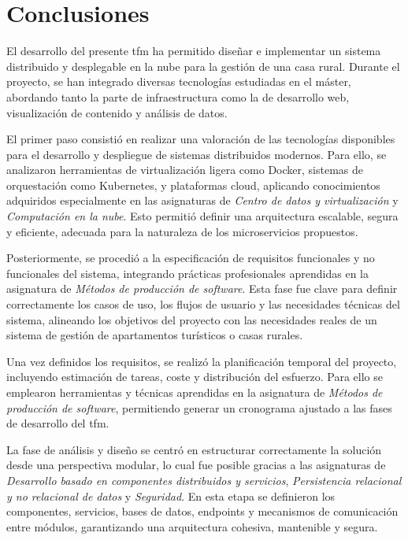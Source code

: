 \section{Conclusiones}
El desarrollo del presente \gls{tfm} ha permitido diseñar e implementar un sistema distribuido y desplegable en la nube para la gestión de una casa rural. Durante el proyecto, se han integrado diversas tecnologías estudiadas en el máster, abordando tanto la parte de infraestructura como la de desarrollo web, visualización de contenido y análisis de datos.

El primer paso consistió en realizar una valoración de las tecnologías disponibles para el desarrollo y despliegue de sistemas distribuidos modernos. Para ello, se analizaron herramientas de virtualización ligera como Docker, sistemas de orquestación como Kubernetes, y plataformas cloud, aplicando conocimientos adquiridos especialmente en las asignaturas de \textit{Centro de datos y virtualización} y \textit{Computación en la nube}. Esto permitió definir una arquitectura escalable, segura y eficiente, adecuada para la naturaleza de los microservicios propuestos.

Posteriormente, se procedió a la especificación de requisitos funcionales y no funcionales del sistema, integrando prácticas profesionales aprendidas en la asignatura de \textit{Métodos de producción de software}. Esta fase fue clave para definir correctamente los casos de uso, los flujos de usuario y las necesidades técnicas del sistema, alineando los objetivos del proyecto con las necesidades reales de un sistema de gestión de apartamentos turísticos o casas rurales.

Una vez definidos los requisitos, se realizó la planificación temporal del proyecto, incluyendo estimación de tareas, coste y distribución del esfuerzo. Para ello se emplearon herramientas y técnicas aprendidas en la asignatura de \textit{Métodos de producción de software}, permitiendo generar un cronograma ajustado a las fases de desarrollo del \gls{tfm}.

La fase de análisis y diseño se centró en estructurar correctamente la solución desde una perspectiva modular, lo cual fue posible gracias a las asignaturas de \textit{Desarrollo basado en componentes distribuidos y servicios}, \textit{Persistencia relacional y no relacional de datos} y \textit{Seguridad}. En esta etapa se definieron los componentes, servicios, bases de datos, endpoints y mecanismos de comunicación entre módulos, garantizando una arquitectura cohesiva, mantenible y segura.

